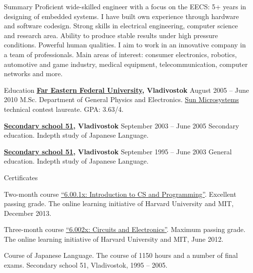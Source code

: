 \documentclass{template}
\begin{document}

\begin{rSection}{Summary}
Proficient wide-skilled engineer with a focus on the EECS: 5+ years in designing of embedded systems. I have built own experience through hardware and software codesign. Strong skills in electrical engineering, computer science and research area. Ability to produce stable results under high pressure conditions. Powerful human qualities. I aim to work in an innovative company in a team of professionals. Main areas of interest: consumer electronics, robotics, automotive and game industry, medical equipment, telecommunication, computer networks and more.
\end{rSection}


\begin{rSection}{Education}
{\bf \href{http://wwwold.dvfu.ru/en/web/fefu/}{Far Eastern Federal University}, Vladivostok} \hfill {August 2005 -- June 2010} \newline
M.Sc. Department of General Physics and Electronics. \newline
\href{http://www.oracle.com}{Sun Microsystems} technical contest laureate. \newline 
GPA: 3.63/4.

{\bf \href{http://www.school51.pupils.ru}{Secondary school 51}, Vladivostok} \hfill {September 2003 -- June 2005} \newline
Secondary education. \newline
Indepth study of Japanese Language.

{\bf \href{http://www.school51.pupils.ru}{Secondary school 51}, Vladivostok} \hfill {September 1995 -- June 2003} \newline
General education. \newline
Indepth study of Japanese Language.
\end{rSection}


\begin{rSection}{Certificates}
\begin{rItemize}
\item Two-month course \href{http://www.vova-ivanov.info/6.00.1x-Certificate.pdf}{\textquotedblleft 6.00.1x: Introduction to CS and Programming\textquotedblright}. Excellent passing grade. \newline
The online learning initiative of Harvard University and MIT, December 2013.
\item Three-month course \href{http://www.vova-ivanov.info/6.002x-Certificate.pdf}{\textquotedblleft 6.002x: Circuits and Electronics\textquotedblright}. Maximum passing grade. \newline
The online learning initiative of Harvard University and MIT, June 2012.
\item Course of Japanese Language. The course of 1150 hours and a number of final exams. \newline
Secondary school 51, Vladivostok, 1995 -- 2005.
\end{rItemize}
\end{rSection}
\end{document}
